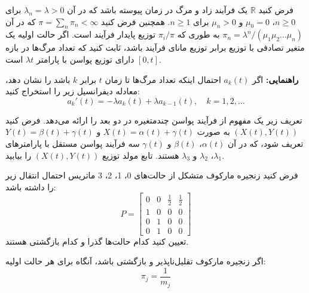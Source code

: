 \documentclass[11pt, a4, twoside]{article}
\begin{document}
		\begin{problem}
			فرض کنید $\mathbb{R}$ یک فرآیند زاد و مرگ در زمان پیوسته باشد که در آن $\lambda_n = \lambda > 0$ برای $n \geq 0$، $\mu_0 = 0$ و $\mu_n > 0$ برای $n \geq 1$. همچنین فرض کنید $\pi = \sum_n \pi_n < \infty$ که در آن $\pi_n = \lambda^n / (\mu_1 \mu_2 \ldots \mu_n)$ به طوری که $\pi_i / \pi$ توزیع پایدار فرآیند است. اگر حالت اولیه یک متغیر تصادفی با توزیع برابر توزیع مانای فرآیند باشد، ثابت کنید که تعداد مرگ‌ها در بازه $[0, t]$ دارای توزیع پواسن با پارامتر $\lambda t$ است.

			\noindent
			\textbf{راهنمایی:} اگر $a_k(t)$ احتمال اینکه تعداد مرگ‌ها تا زمان $t$ برابر $k$ باشد را نشان دهد، معادله دیفرانسیل زیر را استخراج کنید:
			\[
			a_k'(t) = -\lambda a_k(t) + \lambda a_{k-1}(t), \quad k = 1, 2, \ldots
			\]
		\end{problem}
		\begin{problem}
تعریف زیر یک مفهوم از فرآیند پواسن چندمتغیره در دو بعد را ارائه می‌دهد. فرض کنید 
$(X(t), Y(t))$
به صورت 
$X(t) = \alpha(t) + \gamma(t)$
و 
$Y(t) = \beta(t) + \gamma(t)$
تعریف شود، که در آن 
$\alpha(t)$، $\beta(t)$
و 
$\gamma(t)$
سه فرآیند پواسن مستقل با پارامترهای 
$\lambda_1$، $\lambda_2$
و 
$\lambda_3$
هستند. تابع مولد توزیع 
$(X(t), Y(t))$
را بیابید.

\end{problem}

\begin{problem}
فرض کنید زنجیره مارکوف متشکل از حالت‌های 0، 1، 2، 3 ماتریس احتمال انتقال زیر را داشته باشد:
\begin{equation*}
P=
\begin{bmatrix}
0 & 0 & \frac{1}{2} & \frac{1}{2} \\
1 & 0 & 0 & 0\\
0 & 1 & 0 & 0 \\
0 & 1 & 0 & 0
\end{bmatrix}
\end{equation*}
تعیین کنید کدام حالت‌ها گذرا و کدام بازگشتی هستند.
\end{problem}

\begin{problem}
اگر زنجیره مارکوف تقلیل‌ناپذیر و بازگشتی باشد، آنگاه برای هر حالت اولیه:
\begin{equation*}
\pi_j=\frac{1}{m_j}
\end{equation*}
\end{problem}
\end{document}
